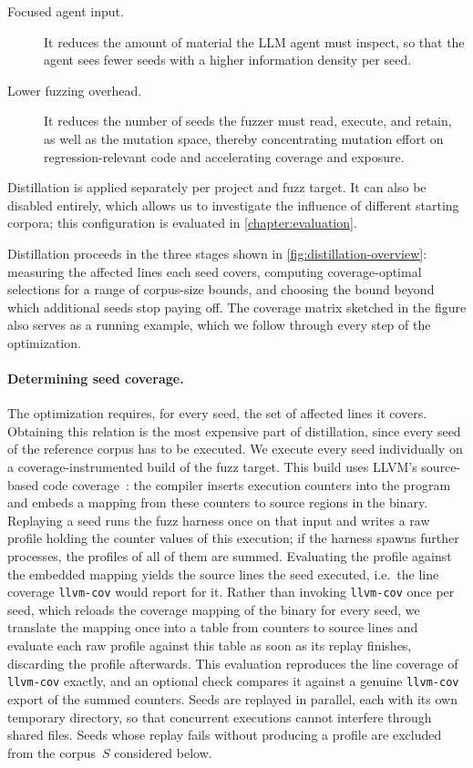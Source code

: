 \begin{description}
  \item[Focused agent input.] It reduces the amount of material the \ac{LLM} agent must inspect, so that the agent sees fewer seeds with a higher information density per seed.
  \item[Lower fuzzing overhead.] It reduces the number of seeds the fuzzer must read, execute, and retain, as well as the mutation space, thereby concentrating mutation effort on regression-relevant code and accelerating coverage and exposure.
\end{description}

\noindent
Distillation is applied separately per project and fuzz target.
It can also be disabled entirely, which allows us to investigate the influence of different starting corpora; this configuration is evaluated in \cref{chapter:evaluation}.

Distillation proceeds in the three stages shown in \cref{fig:distillation-overview}: measuring the affected lines each seed covers, computing coverage-optimal selections for a range of corpus-size bounds, and choosing the bound beyond which additional seeds stop paying off.
The coverage matrix sketched in the figure also serves as a running example, which we follow through every step of the optimization.

\paragraph{Determining seed coverage.}
The optimization requires, for every seed, the set of affected lines it covers.
Obtaining this relation is the most expensive part of distillation, since every seed of the reference corpus has to be executed.
We execute every seed individually on a coverage-instrumented build of the fuzz target.
This build uses LLVM's source-based code coverage~\cite{LlvmLlvmproject2026}: the compiler inserts execution counters into the program and embeds a mapping from these counters to source regions in the binary.
Replaying a seed runs the fuzz harness once on that input and writes a raw profile holding the counter values of this execution; if the harness spawns further processes, the profiles of all of them are summed.
Evaluating the profile against the embedded mapping yields the source lines the seed executed, i.e.\ the line coverage \texttt{llvm-cov} would report for it.
Rather than invoking \texttt{llvm-cov} once per seed, which reloads the coverage mapping of the binary for every seed, we translate the mapping once into a table from counters to source lines and evaluate each raw profile against this table as soon as its replay finishes, discarding the profile afterwards.
This evaluation reproduces the line coverage of \texttt{llvm-cov} exactly, and an optional check compares it against a genuine \texttt{llvm-cov} export of the summed counters.
Seeds are replayed in parallel, each with its own temporary directory, so that concurrent executions cannot interfere through shared files.
Seeds whose replay fails without producing a profile are excluded from the corpus~$S$ considered below.

